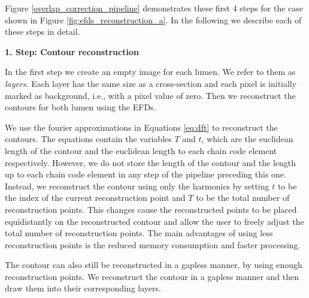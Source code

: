 \documentclass[thesis.tex]{subfiles}
\begin{document}
Figure \ref{overlap_correction_pipeline} demonstrates these first 4 steps for the case shown in Figure \ref{fig:efds_reconstruction_a}.  
In the following we describe each of these steps in detail. 

\textbf{1. Step: Contour reconstruction}

In the first step we create an empty image for each lumen. We refer to them as \textit{layers}. Each layer has the same size as a cross-section and each pixel is initially marked as background, i.e., with a pixel value of zero. Then we reconstruct the contours for both lumen using the EFDs.

We use the fourier approximations in Equations \ref{eq:dft} to reconstruct the contours. The equations contain the variables $T$ and $t$, which are the euclidean length of the contour and the euclidean length to each chain code element respectively. However, we do not store the length of the contour and the length up to each chain code element in any step of the pipeline preceding this one. Instead, we reconstruct the contour using only the harmonics by setting $t$ to be the index of the current reconstruction point and $T$ to be the total number of reconstruction points. This changes cause the reconstructed points to be placed equidistantly on the reconstructed contour and allow the user to freely adjust the total number of reconstruction points. The main advantages of using less reconstruction points is the reduced memory consumption and faster processing.
 
The contour can also still be reconstructed in a gapless manner, by using enough reconstruction points. We reconstruct the contour in a gapless manner and then draw them into their corresponding layers. %

\end{document}
